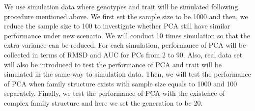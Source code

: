 \documentclass[11pt]{article}
\begin{document}
We use simulation data where genotypes and trait will be simulated following procedure mentioned above.
We first set the sample size to be 1000 and then, we reduce the sample size to 100 to investigate whether PCA still have similar performance under new scenario.
We will conduct 10 times simulation so that the extra variance can be reduced.
For each simulation, performance of PCA will be collected in terms of RMSD and AUC for PCs from 2 to 90.
Also, real data set will also be introduced to test the performance of PCA and trait will be simulated in the same way to simulation data.
Then, we will test the performance of PCA when family structure exists with sample size equals to 1000 and 100 separately.
Finally, we test the performance of PCA with the existence of complex family structure and here we set the generation to be 20.
\end{document}
